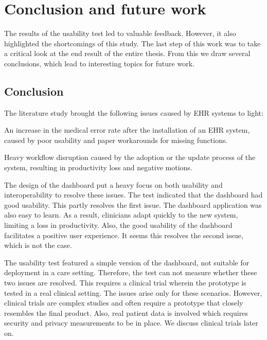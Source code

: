 \section{Conclusion and future work}

The results of the usability test led to valuable feedback. However, it also highlighted the shortcomings of this study. The last step of this work was to take a critical look at the end result of the entire thesis. From this we draw several conclusions, which lead to interesting topics for future work.

    \subsection{Conclusion}

    The literature study brought the following issues caused by EHR systems to light:
    \begin{myitemize}
        \item An increase in the medical error rate after the installation of an EHR system, caused by poor usability and paper workarounds for missing functions.
        \item Heavy workflow disruption caused by the adoption or the update process of the system, resulting in productivity loss and negative motions.
    \end{myitemize}

    \noindent The design of the dashboard put a heavy focus on both usability and interoperability to resolve these issues. The test indicated that the dashboard had good usability. This partly resolves the first issue. The dashboard application was also easy to learn. As a result, clinicians adapt quickly to the new system, limiting a loss in productivity. Also, the good usability of the dashboard facilitates a positive user experience. It seems this resolves the second issue, which is not the case.

    The usability test featured a simple version of the dashboard, not suitable for deployment in a care setting. Therefore, the test can not measure whether these two issues are resolved. This requires a clinical trial wherein the prototype is tested in a real clinical setting. The issues arise only for these scenarios. However, clinical trials are complex studies and often require a prototype that closely resembles the final product. Also, real patient data is involved which requires security and privacy measurements to be in place. We discuss clinical trials later on.


